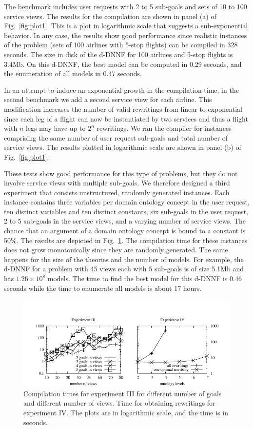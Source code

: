 \documentclass{llncs}
\begin{document}
The benchmark includes user requests with 2 to 5 sub-goals and
sets of 10 to 100 service views. The results for the compilation are
shown in panel (a) of Fig.~\ref{fig:plot1}. This is a plot in logarithmic
scale that suggests a sub-exponential behavior. In any case, the results
show good performance since realistic instances of the problem (sets of 100
airlines with 5-stop flights) can be compiled in 328 seconds.
The size in disk of the d-DNNF for 100 airlines and 5-stop flights is 3.4Mb.
On this d-DNNF, the best model can be computed in 0.29 seconds,
and the enumeration of all models in 0.47 seconds.

In an attempt to induce an exponential growth in the compilation time,
in the second benchmark we add a second service view for each airline.
This modification increases the number of valid rewritings from linear
to exponential since each leg of a flight can now be instantiated by two
services and thus a flight with $n$ legs may have up to $2^n$
rewritings.
We ran the compiler for instances comprising the same number of user request
sub-goals and total number of service views. The results plotted in
logarithmic scale are shown in panel (b) of Fig.~\ref{fig:plot1}.

These tests show good performance for this type of problems, but they do not
involve service views with multiple sub-goals. We therefore designed a
third experiment that consists unstructured, randomly generated instances.
Each instance contains three variables per domain ontology concept in the user request, ten distinct
variables and ten distinct constants, six sub-goals in the user request,
2 to 5 sub-goals in the service views, and a varying number of service views.
The chance that an argument of a domain ontology concept is bound to a constant is 50\%.
The results are depicted in Fig.~\ref{fig:plot4}.
The compilation time for these instances does not grow monotonically
since they are randomly generated. The same happens for the size of
the theories and the number of models. For example, the d-DNNF for 
a problem with 45 views each with 5 sub-goals is of size 5.1Mb and has
$1.26\times 10^8$ models. The time to find the best model for
this d-DNNF is 0.46 seconds while the time to enumerate all models
is about 17 hours.

\begin{figure}[t]
\centering
\includegraphics[width=.6\textwidth]{plots/plot4}
\caption{Compilation times for experiment III for different number of goals
and different number of views. Time for obtaining rewritings for experiment IV. The plots are in logarithmic scale, and the time
is in seconds. }
\label{fig:plot4}
\end{figure}
\end{document}
